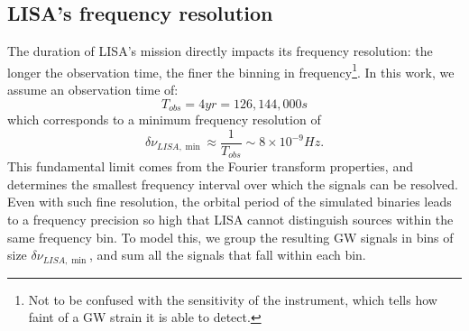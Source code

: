 \subsection{LISA's frequency resolution}
The duration of LISA’s mission directly impacts its frequency resolution: the longer the observation time, the finer the binning in frequency\footnote{Not to be confused with the sensitivity of the instrument, which tells how faint of a GW strain it is able to detect.}.
In this work, we assume an observation time of: 
\[
    T_{obs}=4yr=126,144,000s
\]
which corresponds to a minimum frequency resolution of
\begin{equation}
    \delta\nu_{LISA,\min}\approx \frac{1}{T_{obs}}\sim 8\times 10^{-9}Hz.
    \label{eq: LISA frequency resolution}
\end{equation}
This fundamental limit comes from the Fourier transform properties, and determines the smallest frequency interval over which the signals can be resolved.
{Even with such fine resolution, the orbital period of the simulated binaries leads to a frequency precision so high that LISA cannot distinguish sources within the same frequency bin.}
To model this, we group the resulting GW signals in bins of size $\delta\nu_{LISA,\min}$, and sum all the signals that fall within each bin.

